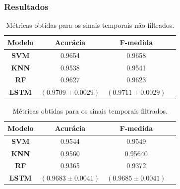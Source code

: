 \documentclass[aspectratio=169]{beamer}
\renewcommand{\indent}{\hspace*{2em}}
\begin{document}
\begin{frame}
	\frametitle{Resultados}
	\justifying

	\vspace{20pt}

	\indent{Utilizando as métricas indicadas anteriormente, foram obtidas as seguintes métricas para as representações utilizadas:}
	
	\begin{minipage}{0.5\textwidth}
	\tiny
	\begin{table}[H]
		\begin{center}
		\caption{Métricas obtidas para os sinais temporais não filtrados.}
		\begin{tabular}{c c c c}
		\toprule
		\textbf{Modelo} & \textbf{Acurácia} & \textbf{F-medida} \\
		\midrule
		\textbf{SVM} & 0.9654 & 0.9658\\
		\textbf{KNN} & 0.9538 & 0.9541\\
		\textbf{RF} & 0.9627 & 0.9623\\
		\textbf{LSTM} & $(0.9709 \pm 0.0029)$ & $(0.9711 \pm 0.0029)$\\
		\bottomrule
		\end{tabular}
		\end{center}
	\end{table}
	\end{minipage}
	\hfill		
	\begin{minipage}{0.5\textwidth}
	\tiny
	\begin{table}[H]
		\begin{center}
		\caption{Métricas obtidas para os sinais temporais filtrados.}
		\begin{tabular}{c c c c}
		\toprule
		\textbf{Modelo} & \textbf{Acurácia} & \textbf{F-medida} \\
		\midrule
		\textbf{SVM} & 0.9544 & 0.9549\\
		\textbf{KNN} & 0.9560 & 0.95640\\
		\textbf{RF} & 0.9365 & 0.9372\\
		\textbf{LSTM} & $(0.9683 \pm 0.0041)$ & $(0.9685 \pm 0.0041)$\\
		\bottomrule
		\end{tabular}
		\end{center}
	\end{table}
	\end{minipage}
	

\end{frame}
\end{document}
